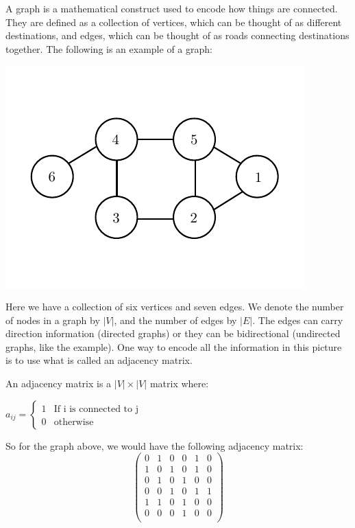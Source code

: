 

A graph is a mathematical construct used to encode how things are connected.  They are defined as a collection of vertices, which can be thought of as different destinations, and edges, which can be thought of as roads connecting destinations together.  The following is an example of a graph:

\begin{center}
\includegraphics[scale=0.75]{graphExample}
\end{center}

Here we have a collection of six vertices and seven edges.  We denote the number of nodes in a graph by $|V|$, and the number of edges by $|E|$.  The edges can carry direction information (directed graphs) or they can be bidirectional (undirected graphs, like the example).  One way to encode all the information in this picture is to use what is called an adjacency matrix.

\begin{definition} An adjacency matrix is a $|V| \times |V|$ matrix where:
\begin{center}
	$a_{ij} = \begin{cases} 1 & \mbox{If i is connected to j} \\ 0 & \mbox{otherwise} \end{cases}$
\end{center}

\end{definition}

So for the graph above, we would have the following adjacency matrix:
\[
\begin{pmatrix}
0 & 1 & 0 & 0 & 1 & 0 \\
1 & 0 & 1 & 0 & 1 & 0 \\
0 & 1 & 0 & 1 & 0 & 0 \\
0 & 0 & 1 & 0 & 1 & 1 \\
1 & 1 & 0 & 1 & 0 & 0 \\
0 & 0 & 0 & 1 & 0 & 0 \\
\end{pmatrix}
\]

